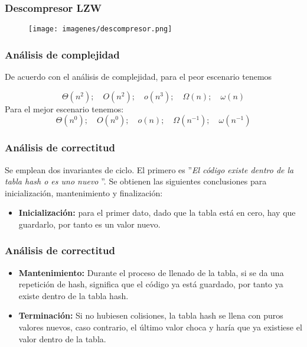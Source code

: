 \documentclass{beamer}
\begin{document}
	\begin{frame}
		\frametitle{Descompresor LZW}
		
		\begin{figure}
			\texttt{[image: imagenes/descompresor.png]}
		\end{figure}

	\end{frame}	%
	\begin{frame}
		\frametitle{Análisis de complejidad}
		De acuerdo con el análisis de complejidad, para el peor escenario tenemos
		
		\begin{equation}
			\Theta\left(n^2 \right);\quad O\left(n^2 \right);\quad o\left(n^3 \right);\quad \Omega\left(n \right);\quad\omega\left(n \right)
		\end{equation}
		Para el mejor escenario tenemos:
		\begin{equation}
			\Theta\left(n^0 \right);\quad O\left(n^0 \right);\quad o\left(n \right);\quad \Omega\left(n^{-1} \right);\quad\omega\left(n^{-1} \right)
		\end{equation}

	\end{frame}
	\begin{frame}
		\frametitle{Análisis de correctitud}
		Se emplean dos invariantes de ciclo. El primero es ''\textit{El código existe dentro de la tabla hash o es uno nuevo
}''. Se obtienen las siguientes conclusiones para inicialización, mantenimiento y finalización:
		
		\begin{itemize}
			\item \textbf{Inicialización:} para el primer dato, dado que la tabla está en cero, hay que guardarlo, por tanto es un valor nuevo.
		\end{itemize}				
		
	\end{frame}
	
	\begin{frame}
	\frametitle{Análisis de correctitud}
		\begin{itemize}
			\item \textbf{Mantenimiento:}  Durante el proceso de llenado de la tabla, si se da una repetición de hash, significa que el código ya está guardado, por tanto ya existe dentro de la tabla hash.


			\item \textbf{Terminación:} Si no hubiesen colisiones, la tabla hash se llena con puros valores nuevos, caso contrario, el último valor choca y haría que ya existiese el valor dentro de la tabla.

		\end{itemize}			
	
	\end{frame}		
\end{document}
